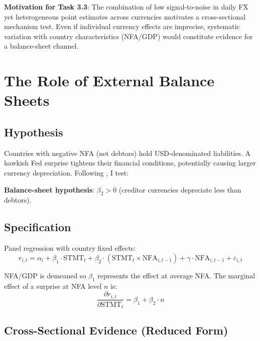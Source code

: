 \documentclass[12pt]{article}
\begin{document}
\textbf{Motivation for Task 3.3}: The combination of low signal-to-noise in daily FX yet heterogeneous point estimates across currencies motivates a cross-sectional mechanism test. Even if individual currency effects are imprecise, systematic variation with country characteristics (NFA/GDP) would constitute evidence for a balance-sheet channel.

\section{The Role of External Balance Sheets}
\label{sec:mechanism}

\subsection{Hypothesis}

Countries with negative NFA (net debtors) hold USD-denominated liabilities. A hawkish Fed surprise tightens their financial conditions, potentially causing larger currency depreciation. Following \citet{bruno2015cross}, I test:

\textbf{Balance-sheet hypothesis}: $\beta_2 > 0$ (creditor currencies depreciate less than debtors).

\subsection{Specification}

Panel regression with country fixed effects:
\begin{equation}
r_{i,t} = \alpha_i + \beta_1 \cdot \text{STMT}_t + \beta_2 \cdot (\text{STMT}_t \times \text{NFA}_{i,t-1}) + \gamma \cdot \text{NFA}_{i,t-1} + \varepsilon_{i,t}
\end{equation}

NFA/GDP is demeaned so $\beta_1$ represents the effect at average NFA. The marginal effect of a surprise at NFA level $n$ is:
\begin{equation}
\frac{\partial r_{i,t}}{\partial \text{STMT}_t} = \beta_1 + \beta_2 \cdot n
\end{equation}

\subsection{Cross-Sectional Evidence (Reduced Form)}
\end{document}
